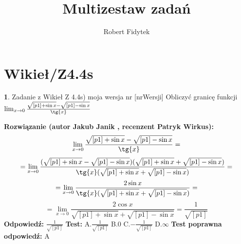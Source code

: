\documentclass[12pt, a4paper]{article}
\title{Multizestaw zadań}
\author{Robert Fidytek}
\date{}
\theoremstyle{definition} %
\newtheorem{zad}{}
\newcommand{\kategoria}[1]{\section{#1}} %
\newcommand{\zadStart}[1]{\begin{zad}#1\newline} %
\newcommand{\zadStop}{\end{zad}}   %
\newcommand{\rozwStart}[2]{\noindent \textbf{Rozwiązanie (autor #1 , recenzent #2): }\newline} %
\newcommand{\rozwStop}{\newline}                                            %
\newcommand{\odpStart}{\noindent \textbf{Odpowiedź:}\newline}    %
\newcommand{\odpStop}{\newline}                                             %
\newcommand{\testStart}{\noindent \textbf{Test:}\newline} %
\newcommand{\testStop}{\newline} %
\newcommand{\kluczStart}{\noindent \textbf{Test poprawna odpowiedź:}\newline} %
\newcommand{\kluczStop}{\newline} %
\begin{document}
\maketitle


\kategoria{Wikieł/Z4.4s}
\zadStart{Zadanie z Wikieł Z 4.4s) moja wersja nr [nrWersji]}
Obliczyć granicę funkcji $\lim_{x \to 0} \frac{\sqrt{[p1]+\sin{x}}-\sqrt{[p1]-\sin{x}}}{\tg{x}}$
\zadStop
\rozwStart{Jakub Janik}{Patryk Wirkus}
$$\lim_{x \to 0} \frac{\sqrt{[p1]+\sin{x}}-\sqrt{[p1]-\sin{x}}}{\tg{x}}=$$
$$=\lim_{x \to 0} \frac{(\sqrt{[p1]+\sin{x}}-\sqrt{[p1]-\sin{x}})(\sqrt{[p1]+\sin{x}}+\sqrt{[p1]-\sin{x}})}{\tg{x}(\sqrt{[p1]+\sin{x}}+\sqrt{[p1]-\sin{x}})}=$$
$$=\lim_{x \to 0} \frac{2\sin{x}}{\tg{x}(\sqrt{[p1]+\sin{x}}+\sqrt{[p1]-\sin{x}})}=$$
$$=\lim_{x \to 0} \frac{2\cos{x}}{\sqrt{[p1]+\sin{x}}+\sqrt{[p1]-\sin{x}}}=\frac{1}{\sqrt{[p1]}}$$
\rozwStop
\odpStart
$\frac{1}{\sqrt{[p1]}}$
\odpStop
\testStart
A.$\frac{1}{\sqrt{[p1]}}$
B.$0$
C.$-\frac{1}{\sqrt{[p1]}}$
D.$\infty$
\testStop
\kluczStart
A
\kluczStop
\end{document}
